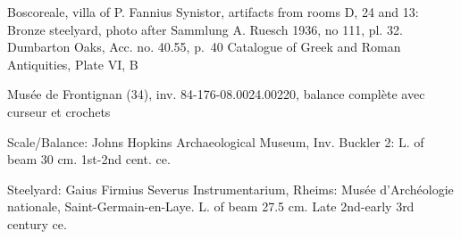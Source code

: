\documentclass{article}
\begin{document}
Boscoreale, villa of
P. Fannius Synistor, artifacts
from rooms D, 24 and 13: 
Bronze steelyard, photo
after Sammlung A. Ruesch
1936, no 111, pl. 32. 
Dumbarton Oaks, Acc. no. 40.55, p.~40 Catalogue of Greek and Roman Antiquities, Plate VI, B

Mus\'ee de Frontignan (34), inv. 84-176-08.0024.00220, balance compl\`ete avec curseur et crochets

Scale/Balance: Johns Hopkins Archaeological Museum, Inv. Buckler 2: L. of beam 30 cm. 1st-2nd cent. ce.

Steelyard: Gaius Firmius Severus Instrumentarium, Rheims: Mus\'ee d'Arch\'eologie nationale, Saint-Germain-en-Laye. L. of beam 27.5 cm. Late 2nd-early 3rd century ce.



\end{document}
